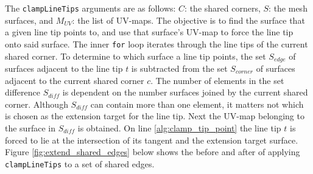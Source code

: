 The \verb|clampLineTips| arguments are as follows:
$C$: the shared corners, $S$: the mesh surfaces, and $M_{UV}$: the list of UV-maps.
The objective is to find the surface that a given line tip points to, and use that surface's UV-map to force the line tip onto said surface.
The inner \verb|for| loop iterates through the line tips of the current shared corner.
To determine to which surface a line tip points, the set $S_{edge}$ of surfaces adjacent to the line tip $t$ is subtracted from the set $S_{corner}$ of surfaces adjacent to the current shared corner $c$.
The number of elements in the set difference $S_{diff}$ is dependent on the number surfaces joined by the current shared corner.
Although $S_{diff}$ can contain more than one element, it matters not which is chosen as the extension target for the line tip.
Next the UV-map belonging to the surface in $S_{diff}$ is obtained.
On line \ref{alg:clamp_tip_point} the line tip $t$ is forced to lie at the intersection of its tangent and the extension target surface.
Figure \ref{fig:extend_shared_edges} below shows the before and after of applying \verb|clampLineTips| to a set of shared edges.

